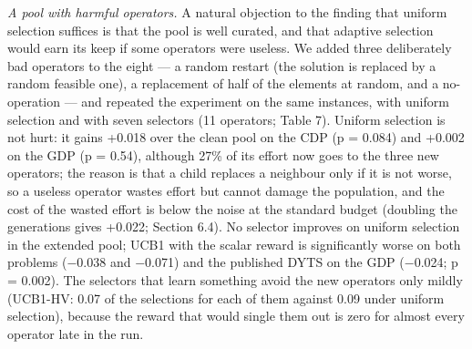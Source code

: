 \emph{A pool with harmful operators.} A natural objection to the finding that uniform selection suffices is that the pool is well curated, and that adaptive selection would earn its keep if some operators were useless. We added three deliberately bad operators to the eight --- a random restart (the solution is replaced by a random feasible one), a replacement of half of the elements at random, and a no-operation --- and repeated the experiment on the same instances, with uniform selection and with seven selectors (11 operators; Table 7). Uniform selection is not hurt: it gains +0.018 over the clean pool on the CDP (p = 0.084) and +0.002 on the GDP (p = 0.54), although 27\% of its effort now goes to the three new operators; the reason is that a child replaces a neighbour only if it is not worse, so a useless operator wastes effort but cannot damage the population, and the cost of the wasted effort is below the noise at the standard budget (doubling the generations gives +0.022; Section 6.4). No selector improves on uniform selection in the extended pool; UCB1 with the scalar reward is significantly worse on both problems ($-$0.038 and $-$0.071) and the published DYTS on the GDP ($-$0.024; p = 0.002). The selectors that learn something avoid the new operators only mildly (UCB1-HV: 0.07 of the selections for each of them against 0.09 under uniform selection), because the reward that would single them out is zero for almost every operator late in the run.

\begin{table}[t]
\centering
\small
\setlength{\tabcolsep}{4pt}
\caption{Pool with three harmful operators (random restart, half replacement, no-operation; 11 operators; n $\leq$ 150, three replicates): difference in $\mathrm{HV}_{\mathrm{norm}}$ of each selector to uniform selection in the same extended pool, and, in the first row, of uniform selection in the extended pool to uniform selection in the clean pool of eight (Holm-adjusted Wilcoxon p in brackets; an asterisk marks p < 0.05)}\label{tab:7}
\end{table}

